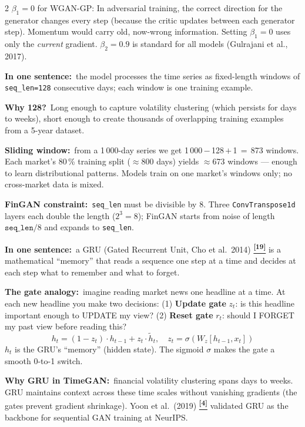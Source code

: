 \documentclass[10pt]{article}
\newcommand{\navybox}[2]{\begin{tcolorbox}[mybox={Navy}{LBg},title={#1}]#2\end{tcolorbox}}
\newcommand{\greenbox}[2]{\begin{tcolorbox}[mybox={FGreen}{GBg},title={#1}]#2\end{tcolorbox}}
\newcommand{\tcite}[1]{%
  \hyperlink{R:#1}{\textsuperscript{\scriptsize\textbf{[#1]}}}}
\begin{document}
\begin{multicols}{2}
{\smallskip
$\beta_1 = 0$ for WGAN-GP: In adversarial training, the correct direction for the generator changes every step (because the critic updates between each generator step). Momentum would carry old, now-wrong information. Setting $\beta_1=0$ uses only the \emph{current} gradient. $\beta_2=0.9$ is standard for all models (Gulrajani et al., 2017).}

\greenbox{seq\_len: What Counts as One Training Example?}{%
\textbf{In one sentence:}\ the model processes the time series as fixed-length windows of \texttt{seq\_len=128} consecutive days; each window is one training example.

\smallskip
\textbf{Why 128?}\ Long enough to capture volatility clustering (which persists for days to weeks), short enough to create thousands of overlapping training examples from a 5-year dataset.

\smallskip
\textbf{Sliding window:}\ from a 1\,000-day series we get 1\,000\,$-$\,128\,$+$\,1\,$=$\,873 windows. Each market's 80\,\% training split ($\approx$800 days) yields $\approx$673 windows --- enough to learn distributional patterns. Models train on one market's windows only; no cross-market data is mixed.

\smallskip
\textbf{FinGAN constraint:}\ \texttt{seq\_len} must be divisible by 8. Three \texttt{ConvTranspose1d} layers each double the length ($2^3=8$); FinGAN starts from noise of length $\texttt{seq\_len}/8$ and expands to \texttt{seq\_len}.}

\columnbreak

\navybox{GRU: Memory Cells for Sequential Data (TimeGAN)}{%
\textbf{In one sentence:}\ a GRU (Gated Recurrent Unit, Cho et al.\ 2014)\tcite{19} is a mathematical ``memory'' that reads a sequence one step at a time and decides at each step what to remember and what to forget.

\smallskip
\textbf{The gate analogy:}\ imagine reading market news one headline at a time. At each new headline you make two decisions: (1) \textbf{Update gate} $z_t$: is this headline important enough to UPDATE my view? (2) \textbf{Reset gate} $r_t$: should I FORGET my past view before reading this?
\[h_t = (1-z_t)\cdot h_{t-1} + z_t \cdot \tilde{h}_t, \quad z_t = \sigma(W_z[h_{t-1},x_t])\]
$h_t$ is the GRU's ``memory'' (hidden state). The sigmoid $\sigma$ makes the gate a smooth 0-to-1 switch.

\smallskip
\textbf{Why GRU in TimeGAN:}\ financial volatility clustering spans days to weeks. GRU maintains context across these time scales without vanishing gradients (the gates prevent gradient shrinkage). Yoon et al.\ (2019)\tcite{4} validated GRU as the backbone for sequential GAN training at NeurIPS.}


\end{multicols}
\end{document}
